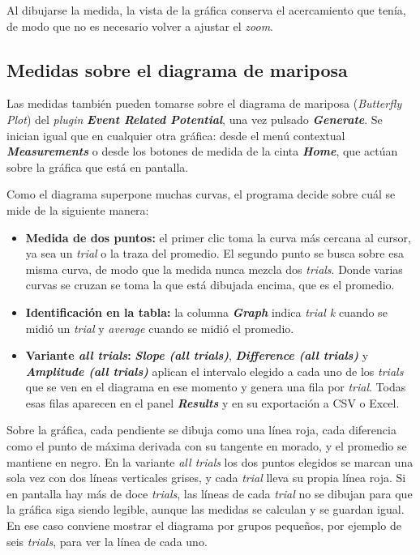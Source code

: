 \documentclass[11pt,a4paper]{article}
\begin{document}
    Al dibujarse la medida, la vista de la gr\'afica conserva el acercamiento que ten\'ia, de modo que no es necesario volver a ajustar el \textit{zoom}.

    \subsection{Medidas sobre el diagrama de mariposa}
    \label{sec:mu_medidas_butterfly}
    Las medidas tambi\'en pueden tomarse sobre el diagrama de mariposa (\textit{Butterfly Plot}) del \textit{plugin} \textbf{\textit{Event Related Potential}}, una vez pulsado \textbf{\textit{Generate}}. Se inician igual que en cualquier otra gr\'afica: desde el men\'u contextual \textbf{\textit{Measurements}} o desde los botones de medida de la cinta \textbf{\textit{Home}}, que act\'uan sobre la gr\'afica que est\'a en pantalla.

    Como el diagrama superpone muchas curvas, el programa decide sobre cu\'al se mide de la siguiente manera:

    \begin{itemize}
        \item \textbf{Medida de dos puntos:} el primer clic toma la curva m\'as cercana al cursor, ya sea un \textit{trial} o la traza del promedio. El segundo punto se busca sobre esa misma curva, de modo que la medida nunca mezcla dos \textit{trials}. Donde varias curvas se cruzan se toma la que est\'a dibujada encima, que es el promedio.
        \item \textbf{Identificaci\'on en la tabla:} la columna \textbf{\textit{Graph}} indica \textit{trial k} cuando se midi\'o un \textit{trial} y \textit{average} cuando se midi\'o el promedio.
        \item \textbf{Variante \textit{all trials}:} \textbf{\textit{Slope (all trials)}}, \textbf{\textit{Difference (all trials)}} y \textbf{\textit{Amplitude (all trials)}} aplican el intervalo elegido a cada uno de los \textit{trials} que se ven en el diagrama en ese momento y genera una fila por \textit{trial}. Todas esas filas aparecen en el panel \textbf{\textit{Results}} y en su exportaci\'on a CSV o Excel.
    \end{itemize}

    Sobre la gr\'afica, cada pendiente se dibuja como una l\'inea roja, cada diferencia como el punto de m\'axima derivada con su tangente en morado, y el promedio se mantiene en negro. En la variante \textit{all trials} los dos puntos elegidos se marcan una sola vez con dos l\'ineas verticales grises, y cada \textit{trial} lleva su propia l\'inea roja. Si en pantalla hay m\'as de doce \textit{trials}, las l\'ineas de cada \textit{trial} no se dibujan para que la gr\'afica siga siendo legible, aunque las medidas se calculan y se guardan igual. En ese caso conviene mostrar el diagrama por grupos peque\~nos, por ejemplo de seis \textit{trials}, para ver la l\'inea de cada uno.
\end{document}

